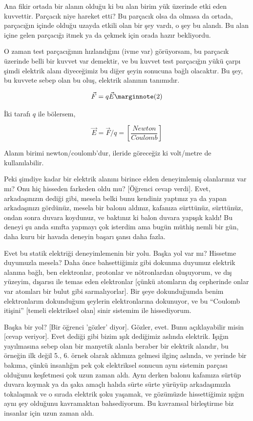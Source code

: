 \documentclass[12pt,fleqn]{article}\usepackage{../../common}
\begin{document}
Ana fikir ortada bir alanın olduğu ki bu alan birim yük üzerinde etki eden
kuvvettir. Parçacık niye hareket etti? Bu parçacık olsa da olmasa da
ortada, parçacığın içinde olduğu uzayda etkili olan bir şey vardı, o şey bu
alandı. Bu alan içine gelen parçacığı itmek ya da çekmek için orada hazır
bekliyordu.

O zaman test parçacığının hızlandığını (ivme var) görüyorsam, bu parçacık
üzerinde belli bir kuvvet var demektir, ve bu kuvvet test parçacığın yükü
çarpı şimdi elektrik alanı diyeceğimiz bu diğer şeyin sonucuna bağlı
olacaktır. Bu şey, bu kuvvete sebep olan bu oluş, elektrik alanının
tanımıdır.

$$ 
\vec{F} = q \vec{E} 
\mlabel{2}
$$

İki tarafı $q$ ile bölersem,

$$ \vec{E} = \vec{F} / q = \left[\frac{Newton}{Coulomb}\right]$$

Alanın birimi newton/coulomb'dur, ileride göreceğiz ki volt/metre de
kullanılabilir.

Peki şimdiye kadar bir elektrik alanını birince elden deneyimlemiş
olanlarınız var mı? Onu hiç hisseden farkeden oldu mu? [Öğrenci cevap
verdi]. Evet, arkadaşınızın dediği gibi, mesela belki bunu kendiniz
yaptınız ya da yapan arkadaşınızı gördünüz, mesela bir balonu aldınız,
kafanıza sürttünüz, sürttünüz, ondan sonra duvara koydunuz, ve baktınız ki
balon duvara yapışık kaldı! Bu deneyi şu anda sınıfta yapmayı çok isterdim
ama bugün müthiş nemli bir gün, daha kuru bir havada deneyin başarı şansı
daha fazla.

Evet bu statik elektriği deneyimlemenin bir yolu. Başka yol var mı?
Hissetme duyumuzla mesela? Daha önce bahsettiğimiz gibi dokunma duyumuz
elektrik alanına bağlı, ben elektronlar, protonlar ve nötronlardan
oluşuyorum, ve dış yüzeyim, dışarısı ile temas eden elektronlar [çünkü
atomların dış cepherinde onlar var atomları bir bulut gibi
sarmalıyorlar]. Bir şeye dokunduğumda benim elektronlarım dokunduğum
şeylerin elektronlarına dokunuyor, ve bu ``Coulomb itişini'' [temeli
elektriksel olan] sinir sistemim ile hissediyorum.

Başka bir yol? [Bir öğrenci 'gözler' diyor]. Gözler, evet. Bunu
açıklayabilir misin [cevap veriyor]. Evet dediği gibi bizim ışık dediğimiz
aslında elektrik. Işığın yayılmasına sebep olan bir manyetik alanla beraber
bir elektrik alandır, bu örneğin ilk değil 5., 6. örnek olarak aklımıza
gelmesi ilginç aslında, ve yerinde bir bakıma, çünkü insanlığın pek çok
elektriksel sonucun aynı sistemin parçası olduğunu keşfetmesi çok uzun
zaman aldı. Aynı derken balonu kafamıza sürtüp duvara koymak ya da şaka
amaçlı halıda sürte sürte yürüyüp arkadaşımızla tokalaşmak ve o sırada
elektrik şoku yaşamak, ve gözümüzde hissettiğimiz ışığın aynı şey olduğunu
kavramaktan bahsediyorum. Bu kavramsal birleştirme biz insanlar için uzun
zaman aldı.
\end{document}
